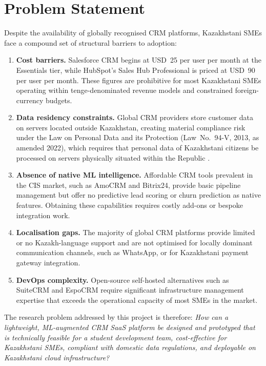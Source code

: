 \section{Problem Statement}

Despite the availability of globally recognised CRM platforms, Kazakhstani
SMEs face a compound set of structural barriers to adoption:

\begin{enumerate}

  \item \textbf{Cost barriers.} Salesforce CRM begins at USD~25 per user
  per month at the Essentials tier, while HubSpot's Sales Hub Professional
  is priced at USD~90 per user per month. These figures are prohibitive for
  most Kazakhstani SMEs operating within tenge-denominated revenue models
  and constrained foreign-currency budgets.

  \item \textbf{Data residency constraints.} Global CRM providers store
  customer data on servers located outside Kazakhstan, creating material
  compliance risk under the Law on Personal Data and its Protection
  (Law~No.~94-V, 2013, as amended 2022), which requires that personal data
  of Kazakhstani citizens be processed on servers physically situated
  within the Republic \citep{kazakhstanlaw94v}.

  \item \textbf{Absence of native ML intelligence.} Affordable CRM tools
  prevalent in the CIS market, such as AmoCRM and Bitrix24, provide basic
  pipeline management but offer no predictive lead scoring or churn
  prediction as native features. Obtaining these capabilities requires
  costly add-ons or bespoke integration work.

  \item \textbf{Localisation gaps.} The majority of global CRM platforms
  provide limited or no Kazakh-language support and are not optimised for
  locally dominant communication channels, such as WhatsApp, or for
  Kazakhstani payment gateway integration.

  \item \textbf{DevOps complexity.} Open-source self-hosted alternatives
  such as SuiteCRM and EspoCRM require significant infrastructure
  management expertise that exceeds the operational capacity of most SMEs
  in the market.

\end{enumerate}

The research problem addressed by this project is therefore:
\textit{How can a lightweight, ML-augmented CRM SaaS platform be designed
and prototyped that is technically feasible for a student development team,
cost-effective for Kazakhstani SMEs, compliant with domestic data
regulations, and deployable on Kazakhstani cloud infrastructure?}


